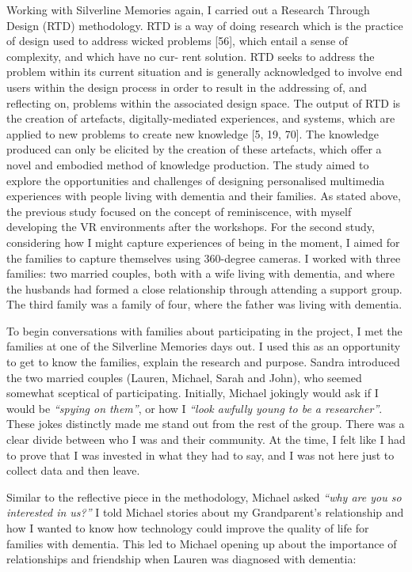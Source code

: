Working with Silverline Memories again, I carried out a Research Through Design (RTD) methodology. RTD is a way of doing research which is the practice of design used to address wicked problems [56], which entail a sense of complexity, and which have no cur- rent solution. RTD seeks to address the problem within its current situation and is generally acknowledged to involve end users within the design process in order to result in the addressing of, and reflecting on, problems within the associated design space. The output of RTD is the creation of artefacts, digitally-mediated experiences, and systems, which are applied to new problems to create new knowledge [5, 19, 70]. The knowledge produced can only be elicited by the creation of these artefacts, which offer a novel and embodied method of knowledge production. The study aimed to explore the opportunities and challenges of designing personalised multimedia experiences with people living with dementia and their families. As stated above, the previous study focused on the concept of reminiscence, with myself developing the VR environments after the workshops. For the second study, considering how I might capture experiences of being in the moment, I aimed for the families to capture themselves using 360-degree cameras. I worked with three families: two married couples, both with a wife living with dementia, and where the husbands had formed a close relationship through attending a support group. The third family was a family of four, where the father was living with dementia. 

To begin conversations with families about participating in the project, I met the families at one of the Silverline Memories days out. I used this as an opportunity to get to know the families, explain the research and purpose. Sandra introduced the two married couples (Lauren, Michael, Sarah and John), who seemed somewhat sceptical of participating. Initially, Michael jokingly would ask if I would be \textit{``spying on them''}, or how I \textit{``look awfully young to be a researcher''}. These jokes distinctly made me stand out from the rest of the group. There was a clear divide between who I was and their community. At the time, I felt like I had to prove that I was invested in what they had to say, and I was not here just to collect data and then leave. 

Similar to the reflective piece in the methodology, Michael asked \textit{``why are you so interested in us?''} I told Michael stories about my Grandparent's relationship and how I wanted to know how technology could improve the quality of life for families with dementia. This led to Michael  opening up about the importance of relationships and friendship when Lauren was diagnosed with dementia:

